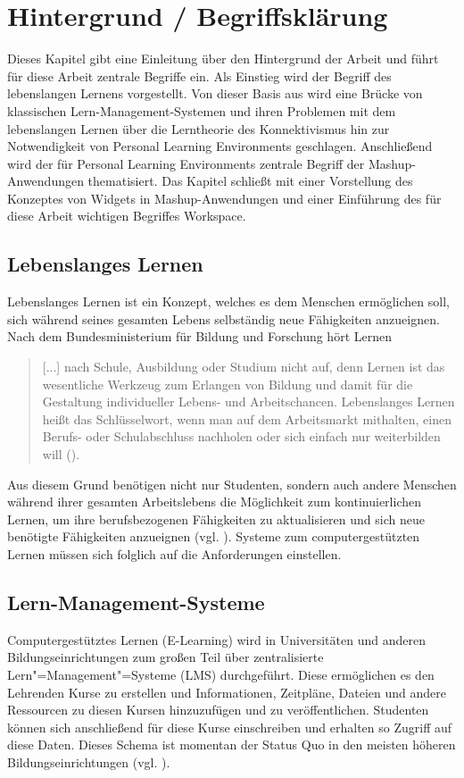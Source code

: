 \chapter{Hintergrund / Begriffsklärung} 
\label{chapter:Kapitel2}

Dieses Kapitel gibt eine Einleitung über den Hintergrund der Arbeit und führt für diese Arbeit zentrale Begriffe ein. Als Einstieg wird der Begriff des lebenslangen Lernens vorgestellt. Von dieser Basis aus wird eine Brücke von klassischen Lern-Management-Systemen und ihren Problemen mit dem lebenslangen Lernen über die Lerntheorie des Konnektivismus hin zur Notwendigkeit von Personal Learning Environments geschlagen. Anschließend wird der für Personal Learning Environments zentrale Begriff der Mashup-Anwendungen thematisiert. Das Kapitel schließt mit einer Vorstellung des Konzeptes von Widgets in Mashup-Anwendungen und einer Einführung des für diese Arbeit wichtigen Begriffes Workspace. 

\section{Lebenslanges Lernen}
Lebenslanges Lernen ist ein Konzept, welches es dem Menschen ermöglichen soll, sich während seines gesamten Lebens selbständig neue Fähigkeiten anzueignen. Nach dem Bundesministerium für Bildung und Forschung hört Lernen \begin{quotation}
 [...] nach Schule, Ausbildung oder Studium nicht auf, denn Lernen ist das wesentliche Werkzeug zum Erlangen von Bildung und damit für die Gestaltung individueller Lebens- und Arbeitschancen. Lebenslanges Lernen heißt das Schlüsselwort, wenn man auf dem Arbeitsmarkt mithalten, einen Berufs- oder Schulabschluss nachholen oder sich einfach nur weiterbilden will (\cite{BMBF2008}).
\end{quotation}
Aus diesem Grund benötigen nicht nur Studenten, sondern auch andere Menschen während ihrer gesamten Arbeitslebens die Möglichkeit zum kontinuierlichen Lernen, um ihre berufsbezogenen Fähigkeiten zu aktualisieren und sich neue benötigte Fähigkeiten anzueignen (vgl. \cite{Attwell2007}). Systeme zum computergestützten Lernen müssen sich folglich auf die Anforderungen einstellen.

\section{Lern-Management-Systeme}\label{section:lms}
Computergestütztes Lernen (E-Learning) wird in Universitäten und anderen Bildungseinrichtungen zum großen Teil über zentralisierte Lern"=Management"=Systeme (LMS) durchgeführt. Diese ermöglichen es den Lehrenden Kurse zu erstellen und Informationen, Zeitpläne, Dateien und andere Ressourcen zu diesen Kursen hinzuzufügen und zu veröffentlichen. Studenten können sich anschließend für diese Kurse einschreiben und erhalten so Zugriff auf diese Daten. Dieses Schema ist momentan der Status Quo in den meisten höheren Bildungseinrichtungen (vgl. \cite{Mott2010}). 


